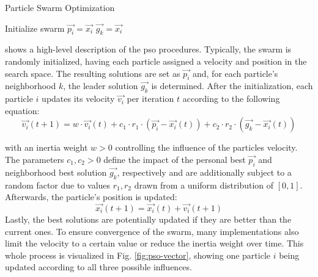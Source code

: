 \begin{algorithm}
	\caption{Particle Swarm Optimization}
	\label{alg:pso}
	\begin{algorithmic}
		\State Initialize swarm
		\Repeat
		\State {}
		\State {}
		 {$\vec{p_i} = \vec{x_i}$}
		 {$\vec{g_k} = \vec{x_i}$}\EndIf \EndIf
		\EndFor
	\end{algorithmic}
\end{algorithm}

 shows a high-level description of the \gls{pso} procedures. Typically, the swarm is randomly initialized, having each particle assigned a velocity and position in the search space. The resulting solutions are set as $\vec{p_i}$ and, for each particle's neighborhood $k$, the leader solution $\vec{g_k}$ is determined. After the initialization, each particle $i$ updates its velocity $\vec{v_i}$ per iteration $t$ according to the following equation:
\begin{equation}
	\vec{v_i}(t+1) = w \cdot \vec{v_i}(t) + c_1 \cdot r_1 \cdot (\vec{p_i} - \vec{x_i}(t)) + c_2 \cdot r_2 \cdot (\vec{g_k} - \vec{x_i}(t))
\end{equation}

with an inertia weight $w > 0$ controlling the influence of the particles velocity. The parameters $c_1, c_2 > 0$ define the impact of the personal best $\vec{p_i}$ and neighborhood best solution $\vec{g_k}$, respectively and are additionally subject to a random factor due to values $r_1, r_2$ drawn from a uniform distribution of $[0,1]$. Afterwards, the particle's position is updated: 
\begin{equation}
	\vec{x_i}(t+1) = \vec{x_i}(t) + \vec{v_i}(t+1)
\end{equation}  
Lastly, the best solutions are potentially updated if they are better than the current ones. To ensure convergence of the swarm, many implementations also limit the velocity to a certain value or reduce the inertia weight over time.
This whole process is visualized in Fig. \ref{fig:pso-vector}, showing one particle $i$ being updated according to all three possible influences. 

